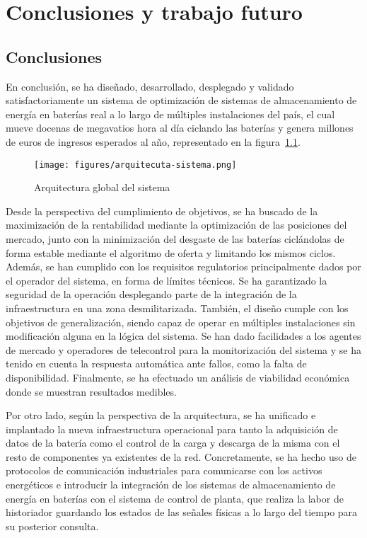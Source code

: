 \cleardoublepage

\chapter{Conclusiones y trabajo futuro}
\label{makereference8}

\section{Conclusiones}
\label{makereference8.1}

En conclusión, se ha diseñado, desarrollado, desplegado y validado satisfactoriamente un sistema de optimización de sistemas de almacenamiento de energía en baterías real a lo largo de múltiples instalaciones del país, el cual mueve docenas de megavatios hora al día ciclando las baterías y genera millones de euros de ingresos esperados al año, representado en la figura~\ref{fig:arquitecuta-sistema}.

\begin{figure}
\centering
\texttt{[image: figures/arquitecuta-sistema.png]}
\caption{Arquitectura global del sistema}
\label{fig:arquitecuta-sistema}
\end{figure}

Desde la perspectiva del cumplimiento de objetivos, se ha buscado de la maximización de la rentabilidad mediante la optimización de las posiciones del mercado, junto con la minimización del desgaste de las baterías ciclándolas de forma estable mediante el algoritmo de oferta y limitando los mismos ciclos. Además, se han cumplido con los requisitos regulatorios principalmente dados por el operador del sistema, en forma de límites técnicos. Se ha garantizado la seguridad de la operación desplegando parte de la integración de la infraestructura en una zona desmilitarizada. También, el diseño cumple con los objetivos de generalización, siendo capaz de operar en múltiples instalaciones sin modificación alguna en la lógica del sistema. Se han dado facilidades a los agentes de mercado y operadores de telecontrol para la monitorización del sistema y se ha tenido en cuenta la respuesta automática ante fallos, como la falta de disponibilidad. Finalmente, se ha efectuado un análisis de viabilidad económica donde se muestran resultados medibles.

Por otro lado, según la perspectiva de la arquitectura, se ha unificado e implantado la nueva infraestructura operacional para tanto la adquisición de datos de la batería como el control de la carga y descarga de la misma con el resto de componentes ya existentes de la red. Concretamente, se ha hecho uso de protocolos de comunicación industriales para comunicarse con los activos energéticos e introducir la integración de los sistemas de almacenamiento de energía en baterías con el sistema de control de planta, que realiza la labor de historiador guardando los estados de las señales físicas a lo largo del tiempo para su posterior consulta.

